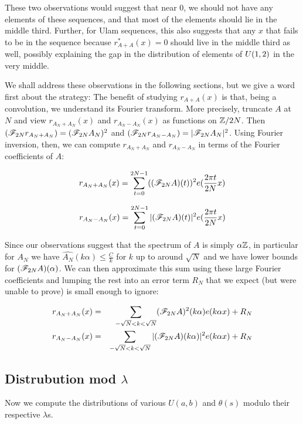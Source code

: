 \documentclass{article}
\theoremstyle{definition}
\theoremstyle{remark}
\numberwithin{equation}{section}
\begin{document}
These two observations would suggest that near 0, we should not have
any elements of these sequences, and that most of the elements should
lie in the middle third.  Further, for Ulam sequences, this also
suggests that any $x$ that fails to be in the sequence because
$r^*_{A+A}(x) = 0$ should live in the middle third as well, possibly
explaining the gap in the distribution of elements of $U(1,2)$ in the
very middle.  

We shall address these observations in the following sections, but we
give a word first about the strategy: The benefit of studying
$r_{A+A}(x)$ is that, being a convolution, we understand its Fourier
transform.  More precisely, truncate $A$ at $N$ and view
$r_{A_N + A_N}(x)$ and $r_{A_N - A_N}(x)$ as functions on $\mathbb{Z}/2N$.
Then $(\mathscr{F}_{2N}r_{A_N + A_N}) = (\mathscr{F}_{2N}A_N)^2$ and
$(\mathscr{F}_{2N}r_{A_N - A_N}) = |\mathscr{F}_{2N}A_N|^2$.  Using Fourier
inversion, then, we can compute $r_{A_N + A_N}$ and $r_{A_N - A_N}$ in
terms of the Fourier coefficients of $A$:

\[r_{A_N + A_N}(x) = \sum_{t=0}^{2N-1} ((\mathscr{F}_{2N}A)(t))^2 e(\frac{2\pi t}{2N} x)\]

\[r_{A_N - A_N}(x) = \sum_{t=0}^{2N-1} |(\mathscr{F}_{2N}A)(t)|^2 e(\frac{2\pi t}{2N} x)\]

Since our observations suggest that the spectrum of $A$ is simply
$\alpha\mathbb{Z}$, in particular for $A_N$ we have
$\widehat{A_N}(k\alpha) \leq \frac{C}{k}$ for $k$ up to around
$\sqrt{N}$ and we have lower bounds for $(\mathscr{F}_{2N}A)(\alpha)$.  We
can then approximate this sum using these large Fourier coefficients
and lumping the rest into an error term $R_N$ that we expect (but were
unable to prove) is small enough to ignore:

\begin{eqnarray*}
  r_{A_N + A_N}(x) &=& \sum_{-\sqrt{N} < k < \sqrt{N}} (\mathscr{F}_{2N}A)^2(k \alpha) e(k\alpha x) + R_N\\
  r_{A_N - A_N}(x) &=& \sum_{-\sqrt{N} < k < \sqrt{N}} |(\mathscr{F}_{2N}A)(k\alpha)|^2 e(k\alpha x) + R_N\\
\end{eqnarray*}

\subsection{Distrubution mod $\lambda$}

Now we compute the distributions of various $U(a,b)$ and $\theta(s)$
modulo their respective $\lambda$s.
\end{document}
